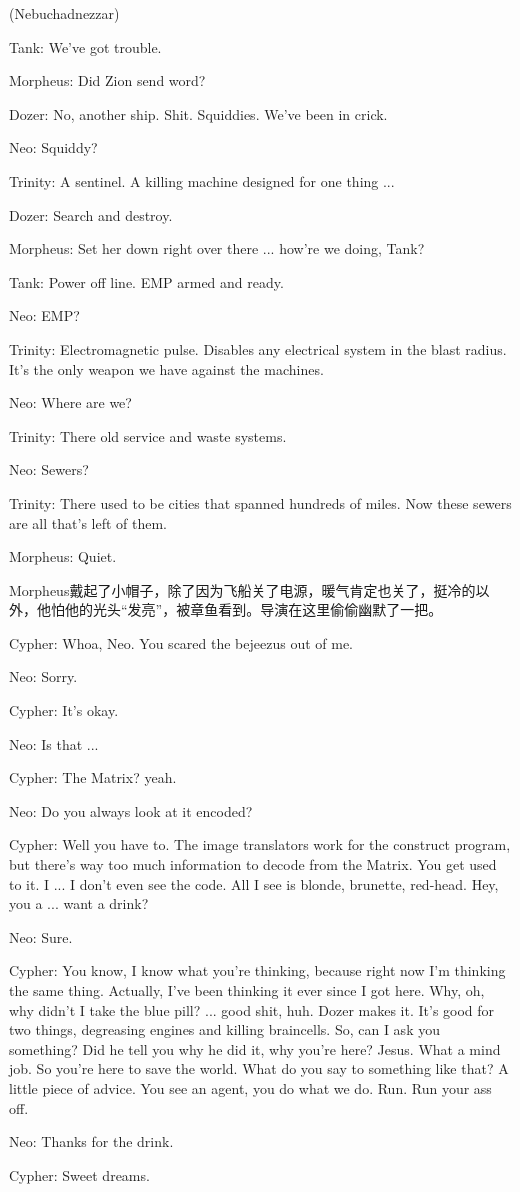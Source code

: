 \documentclass[UTF8]{ctexart}
\newenvironment{myquote}{\color{green} \setlength{\leftskip}{6em} \setlength{\rightskip}{4em} \setlength{\parindent}{-2em}}{\par}
\begin{document}
\begin{myquote}
(Nebuchadnezzar)

Tank: We've got trouble.

Morpheus: Did Zion send word?

Dozer: No, another ship. Shit. Squiddies. We've been in crick.

Neo: Squiddy?

Trinity: A sentinel. A killing machine designed for one thing ...

Dozer: Search and destroy.

Morpheus: Set her down right over there ... how're we doing, Tank?

Tank: Power off line. EMP armed and ready.

Neo: EMP?

Trinity: Electromagnetic pulse. Disables any electrical system in the blast radius. It's the only weapon we have against the machines.

Neo: Where are we?

Trinity: There old service and waste systems.

Neo: Sewers?

Trinity: There used to be cities that spanned hundreds of miles. Now these sewers are all that's left of them.

Morpheus: Quiet.
\end{myquote}

Morpheus戴起了小帽子，除了因为飞船关了电源，暖气肯定也关了，挺冷的以外，他怕他的光头“发亮”，被章鱼看到。导演在这里偷偷幽默了一把。

\begin{myquote}
Cypher: Whoa, Neo. You scared the bejeezus out of me.

Neo: Sorry.

Cypher: It's okay.

Neo: Is that ...

Cypher: The Matrix? yeah.

Neo: Do you always look at it encoded?

Cypher: Well you have to. The image translators work for the construct program, but there's way too much information to decode from the Matrix. You get used to it. I ... I don't even see the code. All I see is blonde, brunette, red-head. Hey, you a ... want a drink?

Neo: Sure.

Cypher: You know, I know what you're thinking, because right now I'm thinking the same thing. Actually, I've been thinking it ever since I got here. Why, oh, why didn't I take the blue pill? ... good shit, huh. Dozer makes it. It's good for two things, degreasing engines and killing braincells. So, can I ask you something? Did he tell you why he did it, why you're here? Jesus. What a mind job. So you're here to save the world. What do you say to something like that? A little piece of advice. You see an agent, you do what we do. Run. Run your ass off.

Neo: Thanks for the drink.

Cypher: Sweet dreams.
\end{myquote}
\end{document}
